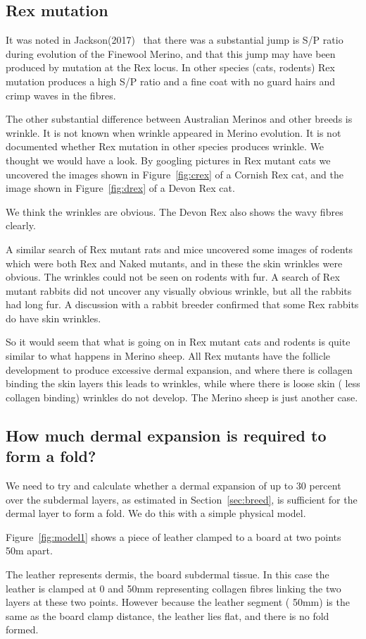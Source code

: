 \documentclass[titlepage]{article}  %
\begin{document}
\subsection{Rex mutation}
It was noted in Jackson(2017)~\cite{jack:17c} that there was a substantial jump is S/P ratio during evolution of the Finewool Merino, and that this jump may have been produced by mutation at the Rex locus. In other species (cats, rodents) Rex mutation produces a high S/P ratio and a fine coat with no guard hairs and crimp waves in the fibres. 

The other substantial difference between Australian Merinos and other breeds is wrinkle. It is not known when wrinkle appeared in Merino evolution. It is not documented whether Rex mutation in other species produces wrinkle. We thought we would have a look. By googling pictures in Rex mutant cats we uncovered the images shown in Figure~\ref{fig:crex} of a Cornish Rex cat, and the image shown in Figure~\ref{fig:drex} of a Devon Rex cat.


We think the wrinkles are obvious. The Devon Rex also shows the wavy fibres clearly.

A similar search of Rex mutant rats and mice uncovered some images of rodents which were both Rex and Naked mutants, and in these the skin wrinkles were obvious. The wrinkles could not be seen on rodents with fur. A search of Rex mutant rabbits did not uncover any visually obvious wrinkle, but all the rabbits had long fur. A discussion with a rabbit breeder confirmed that some Rex rabbits do have skin wrinkles. 

So it would seem that what is going on in Rex mutant cats and rodents is quite similar to what happens in Merino sheep. All Rex mutants have the follicle development to produce excessive dermal expansion, and where there is collagen binding the skin layers this leads to wrinkles, while where there is loose skin ( less collagen binding) wrinkles do not develop. The Merino sheep is just another case.

\subsection{How much dermal expansion is required to form a fold?}
We need to try and calculate whether a dermal expansion of up to 30 percent over the subdermal layers, as estimated in Section~\ref{sec:breed}, is sufficient for the dermal layer to form a fold. We do this with a simple physical model. 

Figure~\ref{fig:model1} shows a piece of leather clamped to a board at two points 50m  apart. 

The leather represents dermis, the board subdermal tissue. In this case the leather is clamped at 0 and 50mm representing collagen fibres linking the two layers at these two points. However because the leather segment ( 50mm) is the same as the board clamp distance, the leather lies flat, and there is no fold formed. 
\end{document}

